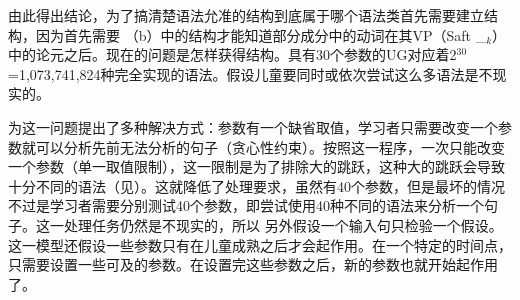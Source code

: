  \citet{Fodor98a,Fodor98b}由此得出结论，为了搞清楚语法允准的结构到底属于哪个语法类首先需要建立结构，因为首先需要 （b）中的结构才能知道部分成分中的动词在其VP（Saft \_$_k$）中的论元之后。现在的问题是怎样获得结构。具有30个参数的UG对应着2$^{30}$=1,073,741,824种完全实现的语法。假设儿童要同时或依次尝试这么多语法是不现实的。

 \citet{GW94a}为这一问题提出了多种解决方式：参数有一个缺省取值，学习者只需要改变一个参数就可以分析先前无法分析的句子（贪心性约束）。按照这一程序，一次只能改变一个参数（单一取值限制），这一限制是为了排除大的跳跃，这种大的跳跃会导致十分不同的语法（见\citealp[--613]{BN96a}）。这就降低了处理要求，虽然有40个参数，但是最坏的情况不过是学习者需要分别测试40个参数，即尝试使用40种不同的语法来分析一个句子。这一处理任务仍然是不现实的，所以 \citet[]{GW94a}另外假设一个输入句只检验一个假设。这一模型还假设一些参数只有在儿童成熟之后才会起作用。在一个特定的时间点，只需要设置一些可及的参数。在设置完这些参数之后，新的参数也就开始起作用了。

